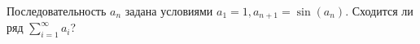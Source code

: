 \documentclass{article}
\begin{document}
Последовательность $a_n$ задана условиями $a_1=1, a_{n+1}=\sin (a_n)$.
Сходится ли ряд $\sum_{i=1}^\infty a_i$?
\end{document}

